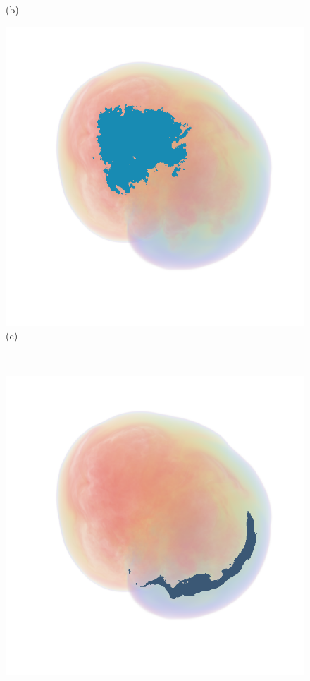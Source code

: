 \documentclass[twoside,twocolumn,10pt]{article}
\begin{document}
\begin{figure}
\begin{minipage}{.2\textwidth}
		(b)
	\end{minipage}
	\begin{minipage}{.2\textwidth}
		\centering
		\includegraphics[width=1\linewidth]{crop/supernova_segment_red}
		(c)
	\end{minipage}~
	\begin{minipage}{.2\textwidth}
		\centering
		\includegraphics[width=1\linewidth]{crop/supernova_segment_green}

\end{minipage}
\end{figure}
\end{document}

